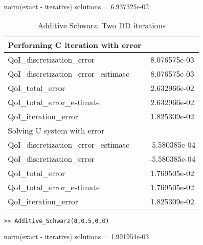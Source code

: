 norm(exact - iterative) solutions =  6.937325e-02

\begin{table}[H]
\begin{center}
\begin{tabular}{||l|c||}
\hline
Performing C iteration with error    & \\
\hline
QoI\_discretization\_error           &  8.076575e-03  \\
QoI\_discretization\_error\_estimate &  8.076575e-03  \\
QoI\_total\_error                    &  2.632966e-02  \\
QoI\_total\_error\_estimate          &  2.632966e-02  \\
QoI\_iteration\_error                &  1.825309e-02  \\
\hline
Solving U system with error          & \\
\hline
QoI\_discretization\_error\_estimate & -5.580385e-04  \\
QoI\_discretization\_error           & -5.580385e-04  \\
QoI\_total\_error                    &  1.769505e-02  \\
QoI\_total\_error\_estimate          &  1.769505e-02  \\
QoI\_iteration\_error                &  1.825309e-02  \\
\hline
\end{tabular}
\end{center}
\caption{Additive Schwarz: Two DD iterations}
\label{tab:AS_2}
\end{table}

\bigskip

{\tt >>  Additive\_Schwarz(8,0.5,0,0)}

norm(exact - iterative) solutions =  1.991954e-03

